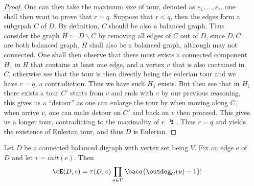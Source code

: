 \begin{proof}
	One can then take the maximum size of tour, denoted as \( e_1, \ldots, e_r \), one shall then want
	to prove that \( r = q \). Suppose that \( r < q \), then the edges form a subgrpah \( C \) of \( D \).
	By definition, \( C \) should be also a balanced graph. Thus consider the graph
	\( H:= D \backslash C \) by removing all edges of \( C \) out of \( D \), since \( D,C \) are both
	balanced graph, \( H \) shall also be a balanced graph, although may not connected. One shall then
	observe that there must exists a connected component \( H_1 \) in \( H \) that contains at least
	one edge, and a vertex \( v \) that is also contained in \( C \), otherwise see that the tour is
	then directly being the eulerian tour and we have \( r = q \), a contradiction. Thus we have such
	\( H_1 \) exists. But then see that in \( H_1 \) there exists a tour \( C' \) starts from \( v \)
	and ends with \( v \) by our previous reasoning, this gives us a ``detour'' as one can enlarge the
	tour by when moving along \( C \), when arrive \( v \), one can make detour on \( C' \) and back
	on \( v \) then proceed. This gives us a longer tour, contradicting to the maximality of \( r \)
	$\lightning$. Thus \( r = q \) and yields the existence of Eulerian tour, and thus \( D \) is
	Eulerian.
\end{proof}

\begin{theorem}
	Let \( D \) be a connected balanced digraph with vertex set being \( V \). Fix an edge \( e \) of \( D \) and let \( v = init(e) \). Then
	\[
		\cE(D,e) = \tau(D,v) \prod_{u\in V} \bace{\outdeg_G(u)-1}!
	\]
\end{theorem}

